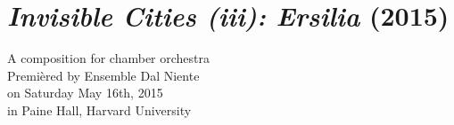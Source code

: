 \chapter{\emph{Invisible Cities (iii): Ersilia} (2015)}

\begin{singlespacing}
\begin{flushright}
A composition for chamber orchestra \\
\vspace*{\baselineskip}
Premi\`{e}red by Ensemble Dal Niente \\
on Saturday May 16th, 2015 \\
in Paine Hall, Harvard University
\end{flushright}
\end{singlespacing}


